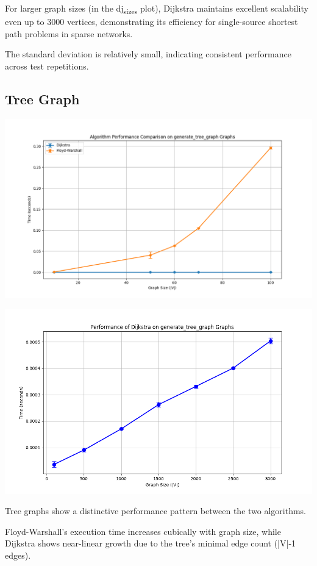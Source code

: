 \documentclass[a4paper,12pt]{article}
\begin{document}
For larger graph sizes (in the dj\textsubscript{sizes} plot), Dijkstra maintains excellent scalability even up to 3000 vertices, demonstrating its efficiency for single-source shortest path problems in sparse networks.

The standard deviation is relatively small, indicating consistent performance across test repetitions.
\subsection{Tree Graph}
\label{sec:org18736ae}
\begin{center}
\includegraphics[width=.9\linewidth]{dijkstra_floyd_tree.png}
\label{org625fd06}
\end{center}
\begin{center}
\includegraphics[width=.9\linewidth]{dijkstra_tree.png}
\label{org6604b10}
\end{center}

Tree graphs show a distinctive performance pattern between the two algorithms.

Floyd-Warshall's execution time increases cubically with graph size, while Dijkstra shows near-linear growth due to the tree's minimal edge count (|V|-1 edges).
\end{document}
